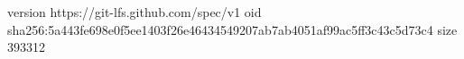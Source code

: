 version https://git-lfs.github.com/spec/v1
oid sha256:5a443fe698e0f5ee1403f26e46434549207ab7ab4051af99ac5ff3c43c5d73c4
size 393312
